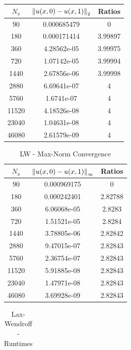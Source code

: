 \documentclass[12pt]{article}
\begin{document}
\begin{enumerate}[(a)]
\begin{minipage}{0.5\textwidth}
\begin{table}[H]
\begin{tabular}{||c|cc||}
\hline \hline
$N_x$  & $\norm{u(x,0)-u(x,1)}_2$ &  Ratios \\
\hline
    90 &    0.000685479 &  0       \\
   180 &    0.000171414 &  3.99897 \\
   360 &    4.28562e-05 &  3.99975 \\
   720 &    1.07142e-05 &  3.99994 \\
  1440 &    2.67856e-06 &  3.99998 \\
  2880 &    6.69641e-07 &  4       \\
  5760 &    1.6741e-07  &  4       \\
 11520 &    4.18526e-08 &  4       \\
 23040 &    1.04631e-08 &  4       \\
 46080 &    2.61579e-09 &  4       \\
\hline \hline
\end{tabular}
\end{table}
\end{minipage}
\begin{minipage}{0.5\textwidth}
\begin{table}[H]
\caption{LW - Max-Norm Convergence}
\centering\begin{tabular}{||c|cc||}
\hline \hline
   $N_x$ & $\norm{u(x,0)-u(x,1)}_{\infty}$ &   Ratios \\
\hline
    90 &      0.000969175 &  0       \\
   180 &      0.000242401 &  2.82788 \\
   360 &      6.06068e-05 &  2.8283  \\
   720 &      1.51521e-05 &  2.8284  \\
  1440 &      3.78805e-06 &  2.82842 \\
  2880 &      9.47015e-07 &  2.82843 \\
  5760 &      2.36754e-07 &  2.82843 \\
 11520 &      5.91885e-08 &  2.82843 \\
 23040 &      1.47971e-08 &  2.82843 \\
 46080 &      3.69928e-09 &  2.82843 \\
\hline \hline
\end{tabular}
\end{table}
\end{minipage}
\begin{minipage}{0.5\textwidth}
\begin{table}[H]
\caption{Lax-Wendroff - Runtimes}
\centering\begin{tabular}{||c|cc||}

\end{tabular}
\end{table}
\end{minipage}
\end{enumerate}
\end{document}
